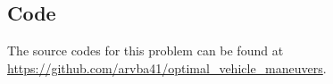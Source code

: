 

\subsection{Code}
The source codes for this problem can be found at \newline \href{https://github.com/arvba41/optimal_vehicle_maneuvers/blob/main/uppgift/ugf5/Max_force_centric_DT_mdl_noFdyn.m}{https://github.com/arvba41/optimal\_vehicle\_maneuvers}.